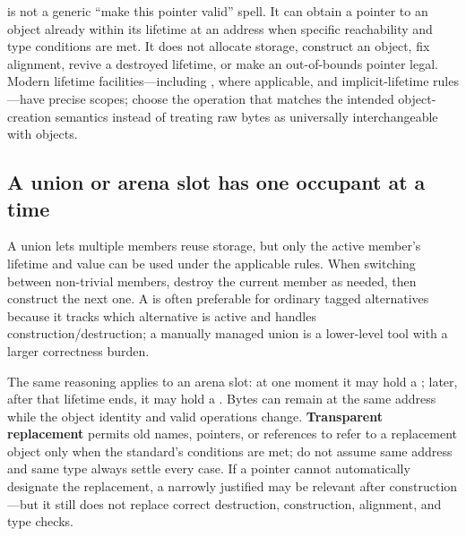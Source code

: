  is not a generic ``make this pointer valid'' spell. It can obtain a pointer to an object already within its lifetime at an address when specific reachability and type conditions are met. It does not allocate storage, construct an object, fix alignment, revive a destroyed lifetime, or make an out-of-bounds pointer legal. Modern lifetime facilities---including ,  where applicable, and implicit-lifetime rules---have precise scopes; choose the operation that matches the intended object-creation semantics instead of treating raw bytes as universally interchangeable with objects.

\subsection{A union or arena slot has one occupant at a time}\label{05-engine-i-ch004-a-union-or-arena-slot-has-one-occupant-at-a-time}

\hypertarget{05-engine-i-ch004-a-union-or-arena-slot-has-one-occupant-at-a-time}{}

A union lets multiple members reuse storage, but only the active member's lifetime and value can be used under the applicable rules. When switching between non-trivial members, destroy the current member as needed, then construct the next one. A  is often preferable for ordinary tagged alternatives because it tracks which alternative is active and handles construction/destruction; a manually managed union is a lower-level tool with a larger correctness burden.

The same reasoning applies to an arena slot: at one moment it may hold a ; later, after that lifetime ends, it may hold a . Bytes can remain at the same address while the object identity and valid operations change. \textbf{Transparent replacement} permits old names, pointers, or references to refer to a replacement object only when the standard's conditions are met; do not assume same address and same type always settle every case. If a pointer cannot automatically designate the replacement, a narrowly justified  may be relevant after construction---but it still does not replace correct destruction, construction, alignment, and type checks.

